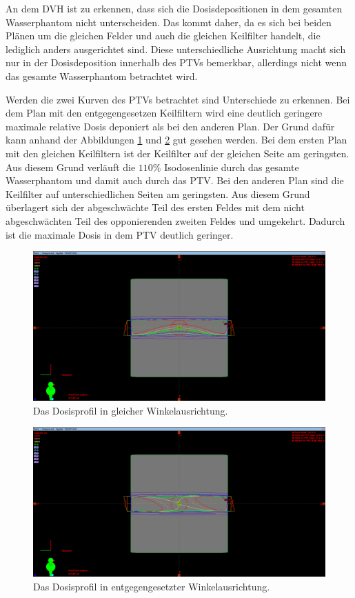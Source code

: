 An dem DVH ist zu erkennen, dass sich die Dosisdepositionen in dem gesamten Wasserphantom
nicht unterscheiden. Das kommt daher, da es sich bei beiden Plänen um die gleichen
Felder und auch die gleichen Keilfilter handelt, die lediglich anders ausgerichtet sind.
Diese unterschiedliche Ausrichtung macht sich nur in der Dosisdeposition innerhalb
des PTVs bemerkbar, allerdings nicht wenn das gesamte Wasserphantom betrachtet wird.

Werden die zwei Kurven des PTVs betrachtet sind Unterschiede zu erkennen. Bei dem
Plan mit den entgegengesetzen Keilfiltern wird eine deutlich geringere maximale relative
Dosis deponiert als bei den anderen Plan. Der Grund dafür kann anhand der Abbildungen
\ref{fig:aufgabe244} und \ref{fig:aufgabe2441} gut gesehen werden. Bei dem ersten Plan
mit den gleichen Keilfiltern ist der Keilfilter auf der gleichen Seite am geringsten.
Aus diesem Grund verläuft die $110\%$ Isodosenlinie durch das gesamte Wasserphantom und
damit auch durch das PTV. Bei den anderen Plan sind die Keilfilter auf unterschiedlichen
Seiten am geringsten. Aus diesem Grund überlagert sich der abgeschwächte Teil des ersten
Feldes mit dem nicht abgeschwächten Teil des opponierenden zweiten Feldes und umgekehrt.
Dadurch ist die maximale Dosis in dem PTV deutlich geringer.


\begin{figure}[H]
	\centering
	\includegraphics[width=0.7\linewidth]{../../Wasserphantom Bilder/Aufgabe244}
	\caption{Das Dosisprofil in gleicher Winkelausrichtung.}
	\label{fig:aufgabe244}
\end{figure}

\begin{figure}[H]
	\centering
	\includegraphics[width=0.7\linewidth]{../../Wasserphantom Bilder/Aufgabe2441}
	\caption{Das Dosisprofil in entgegengesetzter Winkelausrichtung.}
	\label{fig:aufgabe2441}
\end{figure}



